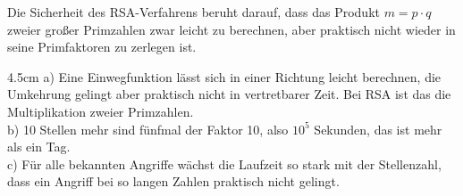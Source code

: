 \question[4]
Die Sicherheit des RSA-Verfahrens beruht darauf, dass das Produkt $m = p \cdot q$ zweier großer Primzahlen zwar leicht zu berechnen, aber praktisch nicht wieder in seine Primfaktoren zu zerlegen ist.
\begin{solutionbox}{4.5cm}
a) Eine Einwegfunktion lässt sich in einer Richtung leicht berechnen, die Umkehrung gelingt aber praktisch nicht in vertretbarer Zeit. Bei RSA ist das die Multiplikation zweier Primzahlen. \\
b) 10 Stellen mehr sind fünfmal der Faktor 10, also $10^5$ Sekunden, das ist mehr als ein Tag. \\
c) Für alle bekannten Angriffe wächst die Laufzeit so stark mit der Stellenzahl, dass ein Angriff bei so langen Zahlen praktisch nicht gelingt.
\end{solutionbox}
